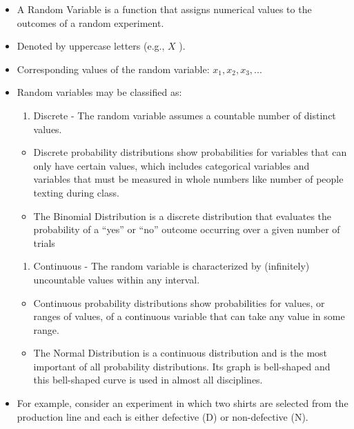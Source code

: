 \documentclass[
  letterpaper,
  DIV=11,
  numbers=noendperiod]{scrreprt}
\providecommand{\tightlist}{%
  \setlength{\itemsep}{0pt}\setlength{\parskip}{0pt}}\usepackage{longtable,booktabs,array}
\begin{document}
\begin{itemize}
\item
  A Random Variable is a function that assigns numerical values to the
  outcomes of a random experiment.
\item
  Denoted by uppercase letters (e.g., \(X\) ).
\item
  Corresponding values of the random variable: \(x_1,x_2, x_3,...\)
\item
  Random variables may be classified as:

  \begin{enumerate}
  \def\labelenumi{\arabic{enumi}.}
  \tightlist
  \item
    Discrete - The random variable assumes a countable number of
    distinct values.
  \end{enumerate}

  \begin{itemize}
  \tightlist
  \item
    Discrete probability distributions show probabilities for variables
    that can only have certain values, which includes categorical
    variables and variables that must be measured in whole numbers like
    number of people texting during class.
  \item
    The Binomial Distribution is a discrete distribution that evaluates
    the probability of a ``yes'' or ``no'' outcome occurring over a
    given number of trials
  \end{itemize}

  \begin{enumerate}
  \def\labelenumi{\arabic{enumi}.}
  \setcounter{enumi}{1}
  \tightlist
  \item
    Continuous - The random variable is characterized by (infinitely)
    uncountable values within any interval.
  \end{enumerate}

  \begin{itemize}
  \tightlist
  \item
    Continuous probability distributions show probabilities for values,
    or ranges of values, of a continuous variable that can take any
    value in some range.
  \item
    The Normal Distribution is a continuous distribution and is the most
    important of all probability distributions. Its graph is bell-shaped
    and this bell-shaped curve is used in almost all disciplines.
  \end{itemize}
\item
  For example, consider an experiment in which two shirts are selected
  from the production line and each is either defective (D) or
  non-defective (N).


\end{itemize}
\end{document}
